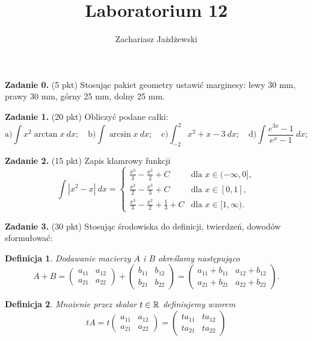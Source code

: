 \documentclass[a4paper,10pt]{article}
\title{Laboratorium 12}
\author{Zachariasz Jażdżewski}
\date{}
\newtheorem{definicja}{Definicja}
\begin{document}
\maketitle

\textbf{Zadanie 0.} (5 pkt) Stosując pakiet geometry ustawić marginesy: lewy 30 mm, prawy 30 mm, górny 25 mm, dolny 25 mm.

\textbf{Zadanie 1.} (20 pkt) Obliczyć podane całki:
\begin{equation*}
	\text{a)} \int x^2 \arctan x \ dx;
	\quad
	\text{b)} \int \arcsin x \ dx;
	\quad
	\text{c)} \int_{-2}^{2} x^2 + x - 3 \ dx;
	\quad
	\text{d)} \int \frac{e^{3x} - 1}{e^x - 1} \ dx;
\end{equation*}

\textbf{Zadanie 2.} (15 pkt) Zapis klamrowy funkcji
\[
	\int |x^2 - x| \ dx = 
	\begin{cases}
		\frac{x^3}{3} - \frac{x^2}{2} + C & \text{dla } x \in (-\infty, 0], \\
		\frac{x^2}{2} - \frac{x^3}{3} + C & \text{dla } x \in [0,1], \\
		\frac{x^3}{3} - \frac{x^2}{2} + \frac{1}{3} + C & \text{dla } x \in [1,\infty).
	\end{cases}
\]

\textbf{Zadanie 3.} (30 pkt) Stosując środowiska do definicji, twierdzeń, dowodów sformułować:
\begin{definicja}
	Dodawanie macierzy $A$ i $B$ określamy następująco
	\begin{equation}
		A + B = 
		\begin{pmatrix}
			a_{11} & a_{12} \\
			a_{21} & a_{22}	
		\end{pmatrix}
		+
		\begin{pmatrix}
			b_{11} & b_{12} \\
			b_{21} & b_{22}	
		\end{pmatrix}
		=
		\begin{pmatrix}
			a_{11} + b_{11} & a_{12} + b_{12} \\
			a_{21} + b_{21} & a_{22} + b_{22}
		\end{pmatrix}
		.
	\end{equation}
\end{definicja}

\begin{definicja}
	Mnożenie przez skalar $t \in \mathbb{R}$ definiujemy wzorem
	\begin{equation}
		tA = t 
		\begin{pmatrix}
			a_{11} & a_{12} \\
			a_{21} & a_{22}
		\end{pmatrix}
		=
		\begin{pmatrix}
			ta_{11} & ta_{12} \\
			ta_{21} & ta_{22}	
		\end{pmatrix}
	\end{equation}
\end{definicja}
\end{document}

